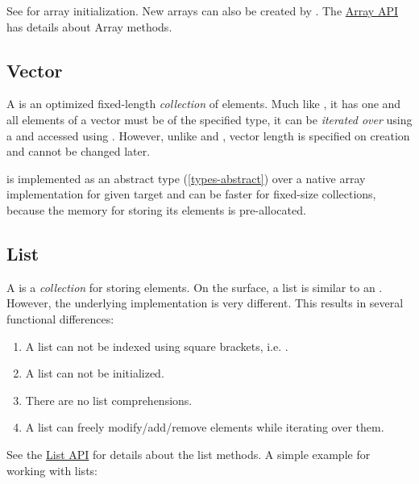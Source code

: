 See  for array initialization.  New arrays can also be created by .  The \href{http://api.haxe.org/Array.html}{Array API} has details about Array methods.

\subsection{Vector}
\label{std-vector}

A  is an optimized fixed-length \emph{collection} of elements. Much like , it has one  and all elements of a vector must be of the specified type, it can be \emph{iterated over} using a  and accessed using . However, unlike  and , vector length is specified on creation and cannot be changed later.


 is implemented as an abstract type (\ref{types-abstract}) over a native array implementation for given target and can be faster for fixed-size collections, because the memory for storing its elements is pre-allocated.

\subsection{List}
\label{std-List}
A  is a \emph{collection} for storing elements.  On the surface, a list is similar to an .  However, the underlying implementation is very different.  This results in several functional differences:

\begin{enumerate}
	\item A list can not be indexed using square brackets, i.e. \expr{[0]}.
	\item A list can not be initialized.
	\item There are no list comprehensions.
	\item A list can freely modify/add/remove elements while iterating over them.
\end{enumerate}

See the \href{http://api.haxe.org/List.html}{List API} for details about the list methods.  A simple example for working with lists:

